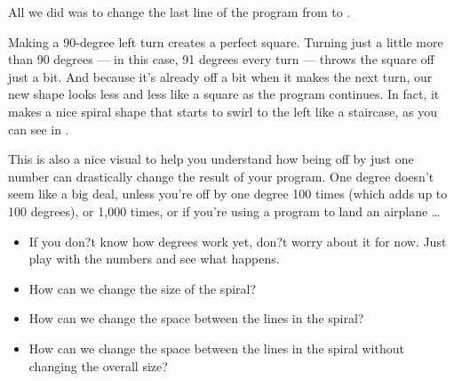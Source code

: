 \documentclass{coderdojo}
\begin{document}

All we did was to change the last line of the program from   to .

Making a 90-degree left turn creates a perfect square. Turning just a little more than 90 degrees --- in this case, 91 degrees every turn --- throws the square off just a bit. And because it's already off a bit when it makes the next turn, our new shape looks less and less like a square as the program continues. In fact, it makes a nice spiral shape that starts to swirl to the left like a staircase, as you can see in .


This is also a nice visual to help you understand how being off by just one number can drastically change the result of your program. One degree doesn't seem like a big deal, unless you're off by one degree 100 times (which adds up to 100 degrees), or 1,000 times, or if you're using a program to land an airplane \ldots


\begin{itemize}
\item[\todoSymbol] \color{todo}
If you don?t know how degrees work yet, don?t worry about it for now. Just play with the numbers and see what happens. 
\item
How can we change the size of the spiral?
\item 
How can we change the space between the lines in the spiral?
\item
How can we change the space between the lines in the spiral without changing the overall size?
\end{itemize}
\end{document}
